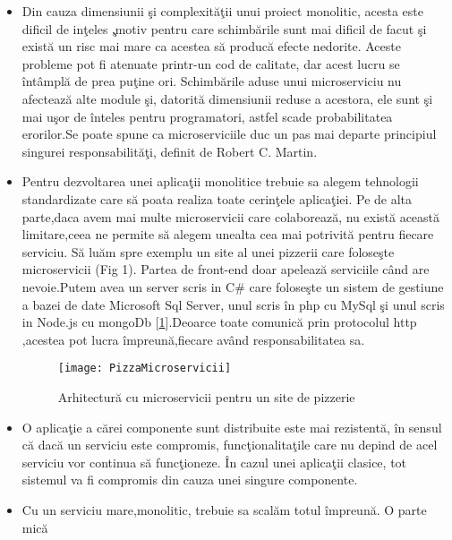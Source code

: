 \documentclass[a4paper,12pt]{report}
\let\oldref\ref
\renewcommand{\ref}[1]{[\oldref{#1}]}
\begin{document}
\begin{itemize}
	\item Din cauza dimensiunii \c si complexit\u a\c tii unui proiect monolitic,
	      acesta este dificil de in\c teles \c ,motiv pentru care schimb\u arile sunt mai dificil de facut \c si exist\u a
	      un risc mai mare ca acestea s\u a produc\u a efecte nedorite. Aceste probleme pot fi atenuate printr-un
	      cod de calitate, dar acest lucru se \^ int\^ ampl\u a de prea pu\c tine ori. Schimb\u arile aduse unui microserviciu nu afecteaz\u a alte
	      module \c si, datorit\u a dimensiunii reduse a acestora, ele sunt \c si mai u\c sor de \^inteles pentru programatori, astfel
	      scade probabilitatea erorilor.Se poate spune ca microserviciile duc un pas mai departe principiul singurei responsabilit\u a\c ti,
	      definit de Robert C. Martin.
	\item Pentru dezvoltarea unei aplica\c tii monolitice trebuie sa alegem tehnologii standardizate care s\u a poata
	      realiza toate cerin\c tele aplica\c tiei. Pe de alta parte,daca avem mai multe microservicii care colaboreaz\u a, nu exist\u a
	      aceast\u a limitare,ceea ne permite s\u a alegem unealta cea mai potrivit\u a pentru fiecare serviciu.
	      S\u a lu\u am spre exemplu un site al unei pizzerii care folose\c ste microservicii (Fig 1).
	      Partea de front-end doar apeleaz\u a serviciile c\^and are nevoie.Putem avea un server scris
	      in C\# care folose\c ste un sistem de gestiune a bazei de date Microsoft Sql Server,
	      unul scris \^in php cu MySql \c si unul scris in Node.js cu mongoDb \ref{fig:PizzaMicroservicii}.Deoarce toate comunic\u a prin
	      protocolul http ,acestea pot lucra \^impreun\u a,fiecare av\^and responsabilitatea sa.
	      \begin{figure}[!htb]
		      \texttt{[image: PizzaMicroservicii]}
		      \caption{Arhitectur\u a cu microservicii pentru un site de pizzerie}
		      \label{fig:PizzaMicroservicii}
	      \end{figure}
	\item O aplica\c tie a c\u arei componente sunt distribuite este mai rezistent\u a, \^in sensul c\u a dac\u a un
	      serviciu este compromis, func\c tionalita\c tile care nu depind de acel serviciu vor continua s\u a func\c tioneze.
	      \^In cazul unei aplica\c tii clasice, tot sistemul va fi compromis din cauza unei singure componente.
	\item Cu un serviciu mare,monolitic, trebuie sa scal\u am totul \^impreun\u a. O parte mic\u a

\end{itemize}
\end{document}
